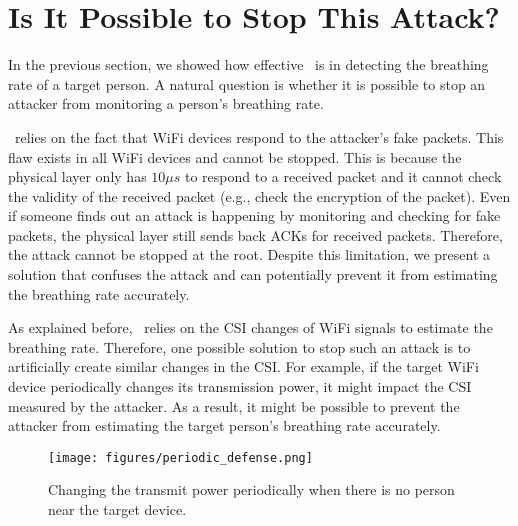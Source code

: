 \section{Is It Possible to Stop This Attack?}

In the previous section, we showed how effective \wisneak\ is in detecting the breathing rate of a target person. A natural question is whether it is possible to stop an attacker from monitoring a person's breathing rate. 

\wisneak\ relies on the fact that WiFi devices respond to the attacker's fake packets. This flaw exists in all WiFi devices and cannot be stopped. This is because the physical layer only has $10 \mu s$ to respond to a received packet and it cannot check the validity of the received packet (e.g., check the encryption of the packet). 
Even if someone finds out an attack is happening by monitoring and checking for fake packets, the physical layer still sends back ACKs for received packets.
Therefore, the attack cannot be stopped at the root. Despite this limitation, we present a solution that confuses the \wisneak attack and can potentially prevent it from estimating the breathing rate accurately.

As explained before, \wisneak\ relies on the CSI changes of WiFi signals to estimate the breathing rate. Therefore, one possible solution to stop such an attack is to artificially create similar changes in the CSI. For example, if the target WiFi device periodically changes its transmission power, it might impact the CSI measured by the attacker. As a result, it might be possible to prevent the attacker from estimating the target person's breathing rate accurately.

\begin{figure}[!t]
    \centering
    \texttt{[image: figures/periodic\_defense.png]}
    \caption{Changing the transmit power periodically when there is no person near the target device.}
    \label{fig:periodic_defense}
\end{figure}

